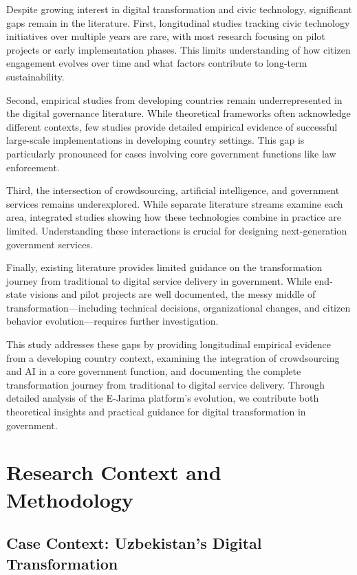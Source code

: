 \documentclass[pdflatex,sn-mathphys-num]{sn-jnl}%
\theoremstyle{thmstyleone}%
\theoremstyle{thmstyletwo}%
\theoremstyle{thmstylethree}%
\begin{document}
Despite growing interest in digital transformation and civic technology, significant gaps remain in the literature. First, longitudinal studies tracking civic technology initiatives over multiple years are rare, with most research focusing on pilot projects or early implementation phases. This limits understanding of how citizen engagement evolves over time and what factors contribute to long-term sustainability.

Second, empirical studies from developing countries remain underrepresented in the digital governance literature. While theoretical frameworks often acknowledge different contexts, few studies provide detailed empirical evidence of successful large-scale implementations in developing country settings. This gap is particularly pronounced for cases involving core government functions like law enforcement.

Third, the intersection of crowdsourcing, artificial intelligence, and government services remains underexplored. While separate literature streams examine each area, integrated studies showing how these technologies combine in practice are limited. Understanding these interactions is crucial for designing next-generation government services.

Finally, existing literature provides limited guidance on the transformation journey from traditional to digital service delivery in government. While end-state visions and pilot projects are well documented, the messy middle of transformation—including technical decisions, organizational changes, and citizen behavior evolution—requires further investigation.

This study addresses these gaps by providing longitudinal empirical evidence from a developing country context, examining the integration of crowdsourcing and AI in a core government function, and documenting the complete transformation journey from traditional to digital service delivery. Through detailed analysis of the E-Jarima platform's evolution, we contribute both theoretical insights and practical guidance for digital transformation in government.

\section{Research Context and Methodology}\label{sec3}

\subsection{Case Context: Uzbekistan's Digital Transformation}\label{subsec8}
\end{document}
